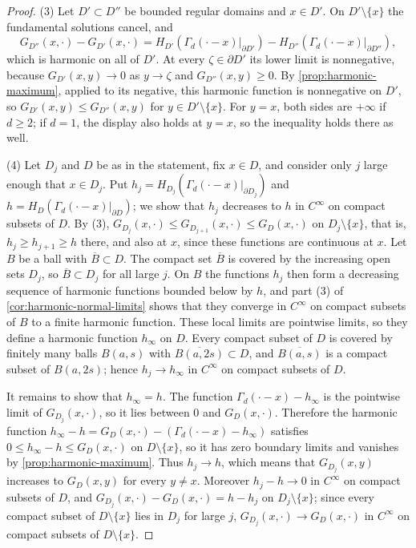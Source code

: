 \begin{proof}
(3) Let $D'\subset D''$ be bounded regular domains and $x\in D'$. On $D'\setminus\{x\}$ the fundamental solutions cancel, and
\[
 G_{D''}(x,\cdot)-G_{D'}(x,\cdot)=H_{D'}(\Gamma_d(\cdot-x)|_{\partial D'})-H_{D''}(\Gamma_d(\cdot-x)|_{\partial D''}),
\]
which is harmonic on all of $D'$. At every $\zeta\in\partial D'$ its lower limit is nonnegative, because $G_{D'}(x,y)\to0$ as $y\to\zeta$ and $G_{D''}(x,y)\geq0$. By \cref{prop:harmonic-maximum}, applied to its negative, this harmonic function is nonnegative on $D'$, so $G_{D'}(x,y)\leq G_{D''}(x,y)$ for $y\in D'\setminus\{x\}$. For $y=x$, both sides are $+\infty$ if $d\geq2$; if $d=1$, the display also holds at $y=x$, so the inequality holds there as well.

(4) Let $D_j$ and $D$ be as in the statement, fix $x\in D$, and consider only $j$ large enough that $x\in D_j$. Put $h_j=H_{D_j}(\Gamma_d(\cdot-x)|_{\partial D_j})$ and $h=H_D(\Gamma_d(\cdot-x)|_{\partial D})$; we show that $h_j$ decreases to $h$ in $C^\infty$ on compact subsets of $D$. By (3), $G_{D_j}(x,\cdot)\leq G_{D_{j+1}}(x,\cdot)\leq G_D(x,\cdot)$ on $D_j\setminus\{x\}$, that is, $h_j\geq h_{j+1}\geq h$ there, and also at $x$, since these functions are continuous at $x$. Let $B$ be a ball with $\overline B\subset D$. The compact set $\overline B$ is covered by the increasing open sets $D_j$, so $\overline B\subset D_j$ for all large $j$. On $B$ the functions $h_j$ then form a decreasing sequence of harmonic functions bounded below by $h$, and part (3) of \cref{cor:harmonic-normal-limits} shows that they converge in $C^\infty$ on compact subsets of $B$ to a finite harmonic function. These local limits are pointwise limits, so they define a harmonic function $h_\infty$ on $D$. Every compact subset of $D$ is covered by finitely many balls $B(a,s)$ with $\overline{B(a,2s)}\subset D$, and $\overline{B(a,s)}$ is a compact subset of $B(a,2s)$; hence $h_j\to h_\infty$ in $C^\infty$ on compact subsets of $D$.

It remains to show that $h_\infty=h$. The function $\Gamma_d(\cdot-x)-h_\infty$ is the pointwise limit of $G_{D_j}(x,\cdot)$, so it lies between $0$ and $G_D(x,\cdot)$. Therefore the harmonic function $h_\infty-h=G_D(x,\cdot)-(\Gamma_d(\cdot-x)-h_\infty)$ satisfies $0\leq h_\infty-h\leq G_D(x,\cdot)$ on $D\setminus\{x\}$, so it has zero boundary limits and vanishes by \cref{prop:harmonic-maximum}. Thus $h_j\to h$, which means that $G_{D_j}(x,y)$ increases to $G_D(x,y)$ for every $y\neq x$. Moreover $h_j-h\to0$ in $C^\infty$ on compact subsets of $D$, and $G_{D_j}(x,\cdot)-G_D(x,\cdot)=h-h_j$ on $D_j\setminus\{x\}$; since every compact subset of $D\setminus\{x\}$ lies in $D_j$ for large $j$, $G_{D_j}(x,\cdot)\to G_D(x,\cdot)$ in $C^\infty$ on compact subsets of $D\setminus\{x\}$.
\end{proof}
